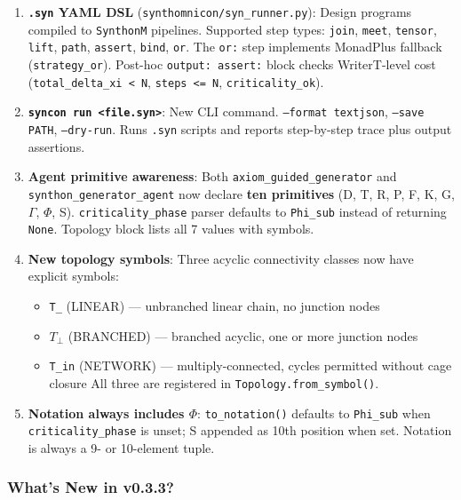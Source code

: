 \documentclass[12pt,a4paper]{article}
\begin{document}
\begin{enumerate}
    \item \textbf{\texttt{.syn} YAML DSL} (\texttt{synthomnicon/syn\_runner.py}): Design programs compiled to \texttt{SynthonM} pipelines. Supported step types: \texttt{join}, \texttt{meet}, \texttt{tensor}, \texttt{lift}, \texttt{path}, \texttt{assert}, \texttt{bind}, \texttt{or}. The \texttt{or:} step implements MonadPlus fallback (\texttt{strategy\_or}). Post-hoc \texttt{output: assert:} block checks WriterT-level cost (\texttt{total\_delta\_xi \textless{} N}, \texttt{steps \textless{}= N}, \texttt{criticality\_ok}).
    \item \textbf{\texttt{syncon run \textless{}file.syn\textgreater{}}}: New CLI command. \texttt{--format text\textbar{}json}, \texttt{--save PATH}, \texttt{--dry-run}. Runs \texttt{.syn} scripts and reports step-by-step trace plus output assertions.
    \item \textbf{Agent primitive awareness}: Both \texttt{axiom\_guided\_generator} and \texttt{synthon\_generator\_agent} now declare \textbf{ten primitives} (D, T, R, P, F, K, G, $\Gamma$, $\Phi$, S). \texttt{criticality\_phase} parser defaults to \texttt{Phi\_sub} instead of returning \texttt{None}. Topology block lists all 7 values with symbols.
    \item 
    \textbf{New topology symbols}: Three acyclic connectivity classes now have explicit symbols:

    \begin{itemize}
    \item \texttt{T\_\textbar{}} (LINEAR) --- unbranched linear chain, no junction nodes
    \item \texttt{$T_{\perp}$} (BRANCHED) --- branched acyclic, one or more junction nodes
    \item \texttt{T\_in} (NETWORK) --- multiply-connected, cycles permitted without cage closure
All three are registered in \texttt{Topology.from\_symbol()}.
\end{itemize}

    \item \textbf{Notation always includes $\Phi$}: \texttt{to\_notation()} defaults to \texttt{Phi\_sub} when \texttt{criticality\_phase} is unset; S appended as 10th position when set. Notation is always a 9- or 10-element tuple.
\end{enumerate}

\subsubsection{What's New in v0.3.3?}
\end{document}
